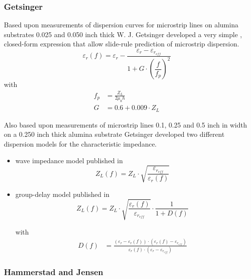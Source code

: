\documentclass[10pt]{report}
\begin{document}
\subsubsection{Getsinger}

Based upon measurements of dispersion curves for microstrip lines on
alumina substrates 0.025 and 0.050 inch thick W. J. Getsinger
\cite{Getsinger} developed a very simple , closed-form expression that
allow slide-rule prediction of microstrip dispersion.
\begin{equation}
\varepsilon_{r}(f) = \varepsilon_{r} - \frac{\varepsilon_{r} - \varepsilon_{r_{eff}}}{1 + G\cdot \left(\dfrac{f}{f_{p}}\right)^{2}}
\end{equation}
with
\begin{align}
f_{p} &= \frac{Z_{L}}{2\mu_{0} h}\\
G &= 0.6 + 0.009\cdot Z_{L}
\end{align}

Also based upon measurements of microstrip lines 0.1, 0.25 and 0.5
inch in width on a 0.250 inch thick alumina substrate Getsinger
\cite{Getsinger2} developed two different dispersion models for the
characteristic impedance.

\begin{itemize}
\item wave impedance model published in \cite{Getsinger2}
\begin{equation}
Z_{L}(f) = Z_{L}\cdot\sqrt{\frac{\varepsilon_{r_{eff}}}{\varepsilon_{r}(f)}}
\end{equation}

\item group-delay model published in \cite{Getsinger3}
\begin{equation}
Z_{L}(f) = Z_{L}\cdot\sqrt{\frac{\varepsilon_{r}(f)}{\varepsilon_{r_{eff}}}}\cdot\frac{1}{1 + D(f)}
\end{equation}

with
\begin{align}
D(f) &= \frac{\left(\varepsilon_{r} - \varepsilon_{r}(f)\right)\cdot\left(\varepsilon_{r}(f) - \varepsilon_{r_{eff}}\right)}{\varepsilon_{r}(f)\cdot\left(\varepsilon_{r} - \varepsilon_{r_{eff}}\right)}
\end{align}
\end{itemize}

\subsubsection{Hammerstad and Jensen}
\end{document}
